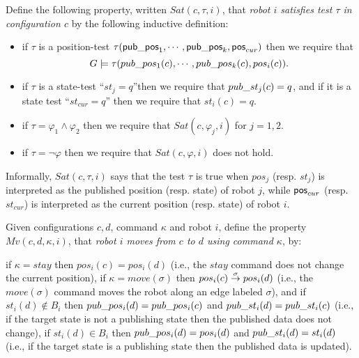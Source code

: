 Define the following property, written $Sat(c,\tau,i)$, that \emph{robot $i$ satisfies test $\tau$ in configuration $c$}  by the following inductive definition: \label{def:sat}
\begin{itemize}
\item if $\tau$ is a position-test $\tau(\mathsf{pub\_pos}_1, \cdots, \mathsf{pub\_pos}_k,\mathsf{pos}_{cur})$ then we require that
\[
G \models \tau(pub\_pos_1(c), \cdots, pub\_pos_k(c),pos_i(c)).
\]
\item if $\tau$ is a state-test ``$st_j = q$''then we require that $pub\_st_j(c) = q$, and if it is a state test ``$st_{cur} = q$'' then we require that
$st_i(c) = q$.
\item if $\tau = \varphi_1 \wedge \varphi_2$ then we require that $Sat(c,\varphi_j,i)$ for $j = 1,2$.
\item if $\tau = \neg \varphi$ then we require that $Sat(c,\varphi,i)$ does not hold.
\end{itemize}

Informally, $Sat(c,\tau,i)$ says that the test $\tau$ is true when $pos_j$ (resp. $st_j$) is interpreted as the published position (resp. state) of robot $j$, while $\mathsf{pos}_{cur}$ (resp. $st_{cur}$) is interpreted as the current position (resp. state) of robot $i$.


 Given configurations $c,d$, command $\kappa$ and robot $i$, define the property $Mv(c,d,\kappa,i)$, that \emph{robot $i$ moves from $c$ to $d$ using command $\kappa$}, by: \label{def:mv}
\begin{itemize}
\- if $\kappa = stay$ then $pos_i(c) = pos_i(d)$ (i.e., the $stay$ command does not change the current position),
\- if $\kappa = move(\sigma)$ then $pos_i(c) \stackrel{{\sigma}}{\rightarrow} pos_i(d)$ (i.e., the $move(\sigma)$ command moves the robot along an edge labeled $\sigma$), and
\- if $st_i(d) \not \in B_i$ then $pub\_pos_i(d) = pub\_pos_i(c)$ and $pub\_st_i(d) = pub\_st_i(c)$ (i.e., if the target state is not a publishing state then the published data does not change),
\- if $st_i(d) \in B_i$ then $pub\_pos_i(d) = pos_i(d)$ and $pub\_st_i(d) = st_i(d)$ (i.e., if the target state is a publishing state then the published data is updated).
\end{itemize}

